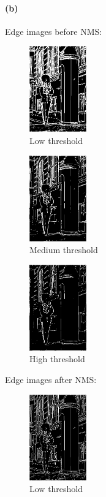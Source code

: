 \documentclass{article}
\newcommand{\spart}[1]{\paragraph{(#1)}}
\begin{document}
\spart{b} Edge images before NMS:

\begin{figure}[!h]
  \centering
  \includegraphics[height=10em]{code/outputs/prob3_b_0.png}
  \caption{Low threshold}
\end{figure}

\begin{figure}[!h]
  \centering
  \includegraphics[height=10em]{code/outputs/prob3_b_1.png}
  \caption{Medium threshold}
\end{figure}

\begin{figure}[!h]
  \centering
  \includegraphics[height=10em]{code/outputs/prob3_b_2.png}
  \caption{High threshold}
\end{figure}

Edge images after NMS:

\begin{figure}[!h]
  \centering
  \includegraphics[height=10em]{code/outputs/prob3_b_nms0.png}
  \caption{Low threshold}
\end{figure}
\end{document}
